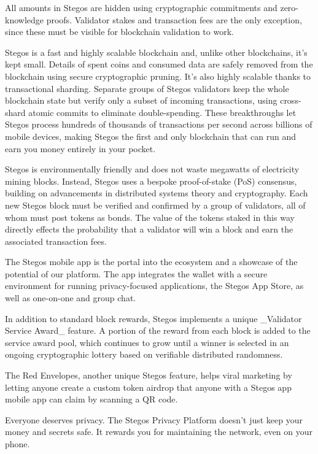 \documentclass[a4paper, 10pt, conference]{ieeeconf}
\begin{document}
All amounts in Stegos are hidden using cryptographic commitments and zero-knowledge proofs. Validator stakes and transaction fees are the only exception, since these must be visible for blockchain validation to work. 

Stegos is a fast and highly scalable blockchain and, unlike other blockchains, it’s kept small. Details of spent coins and consumed data are safely removed from the blockchain using secure cryptographic pruning. It's also highly scalable thanks to transactional sharding. Separate groups of Stegos validators keep the whole blockchain state but verify only a subset of incoming transactions, using cross-shard atomic commits to eliminate double-spending. These breakthroughs let Stegos process hundreds of thousands of transactions per second across billions of mobile devices, making Stegos the first and only blockchain that can run and earn you money entirely in your pocket.

Stegos is environmentally friendly and does not waste megawatts of electricity mining blocks. Instead, Stegos uses a bespoke proof-of-stake (PoS) consensus, building on advancements in distributed systems theory and cryptography. Each new Stegos block must be verified and confirmed by a group of validators, all of whom must post tokens as bonds. The value of the tokens staked in this way directly effects the probability that a validator will win a block and earn the associated transaction fees. 

The Stegos mobile app is the portal into the ecosystem and a showcase of the potential of our platform. The app integrates the wallet with a secure environment for running privacy-focused applications, the Stegos App Store, as well as one-on-one and group chat.

In addition to standard block rewards, Stegos implements a unique _Validator Service Award_ feature. A portion of the reward from each block is added to the service award pool, which continues to grow until a winner is selected in an ongoing cryptographic lottery based on verifiable distributed randomness. 

The Red Envelopes, another unique Stegos feature, helps viral marketing by letting anyone create a custom token airdrop that anyone with a Stegos app mobile app can claim by scanning a QR code.

Everyone deserves privacy. The Stegos Privacy Platform doesn’t just keep your money and secrets safe. It rewards you for maintaining the network, even on your phone.    
\end{document}
